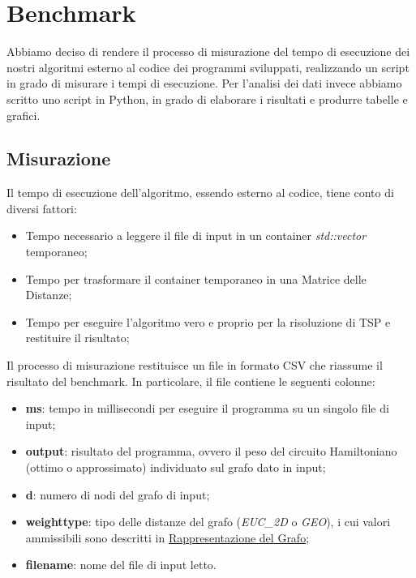\section{Benchmark}
\label{cap:benchmark-process}

Abbiamo deciso di rendere il processo di misurazione del tempo di
esecuzione dei nostri algoritmi esterno al codice dei programmi
sviluppati, realizzando un script in grado di misurare i tempi di
esecuzione. Per l'analisi dei dati invece abbiamo scritto uno script
in Python, in grado di elaborare i risultati e produrre tabelle e
grafici.

\subsection{Misurazione}

Il tempo di esecuzione dell'algoritmo, essendo esterno al codice,
tiene conto di diversi fattori:

\begin{itemize}
    \item Tempo necessario a leggere il file di input in un container
      \textit{std::vector} temporaneo;
    \item Tempo per trasformare il container temporaneo in una Matrice
      delle Distanze;
    \item Tempo per eseguire l'algoritmo vero e proprio per la
      risoluzione di TSP e restituire il risultato;
\end{itemize}

\noindent Il processo di misurazione restituisce un file in formato
CSV che riassume il risultato del benchmark. In particolare, il file
contiene le seguenti colonne:

\begin{itemize}
    \item \textbf{ms}: tempo in millisecondi per eseguire il programma
      su un singolo file di input;
    \item \textbf{output}: risultato del programma, ovvero il peso
      del circuito Hamiltoniano (ottimo o approssimato) individuato sul grafo dato in input;
    \item \textbf{d}: numero di nodi del grafo di input;
    \item \textbf{weight\textunderscore type}: tipo delle distanze del
      grafo (\textit{EUC\_2D} o \textit{GEO}), i cui valori ammissibili sono descritti in \hyperref[sub:graph-representation]{Rappresentazione del Grafo};
    \item \textbf{filename}: nome del file di input letto.
\end{itemize}

